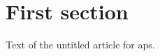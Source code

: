 \documentclass[aps]{revtex4-1}
\begin{document}
\author{Someone Untitled}
\begin{abstract}
Text of the untitled abstract.
\end{abstract}
\maketitle
\section{First section}
Text of the untitled article for aps.
\end{document}
